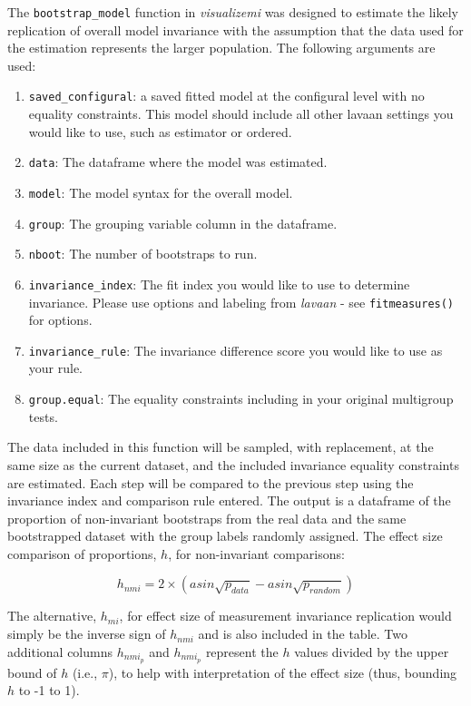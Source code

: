 \documentclass[
  man,floatsintext]{apa7}
\providecommand{\tightlist}{%
  \setlength{\itemsep}{0pt}\setlength{\parskip}{0pt}}
\begin{document}
The \texttt{bootstrap\_model} function in \emph{visualizemi} was designed to estimate the likely replication of overall model invariance with the assumption that the data used for the estimation represents the larger population. The following arguments are used:

\begin{enumerate}
\def\labelenumi{\arabic{enumi})}
\tightlist
\item
  \texttt{saved\_configural}: a saved fitted model at the configural level with no equality constraints. This model should include all other lavaan settings you would like to use, such as estimator or ordered.
\item
  \texttt{data}: The dataframe where the model was estimated.
\item
  \texttt{model}: The model syntax for the overall model.
\item
  \texttt{group}: The grouping variable column in the dataframe.
\item
  \texttt{nboot}: The number of bootstraps to run.
\item
  \texttt{invariance\_index}: The fit index you would like to use to determine invariance. Please use options and labeling from \emph{lavaan} - see \texttt{fitmeasures()} for options.
\item
  \texttt{invariance\_rule}: The invariance difference score you would like to use as your rule.
\item
  \texttt{group.equal}: The equality constraints including in your original multigroup tests.
\end{enumerate}

The data included in this function will be sampled, with replacement, at the same size as the current dataset, and the included invariance equality constraints are estimated. Each step will be compared to the previous step using the invariance index and comparison rule entered. The output is a dataframe of the proportion of non-invariant bootstraps from the real data and the same bootstrapped dataset with the group labels randomly assigned. The effect size comparison of proportions, \(h\), for non-invariant comparisons:

\[h_{nmi} = 2 \times (asin\sqrt{p_{data}} - asin\sqrt{p_{random}})\]

The alternative, \(h_{mi}\), for effect size of measurement invariance replication would simply be the inverse sign of \(h_{nmi}\) and is also included in the table. Two additional columns \(h_{nmi_p}\) and \(h_{nmi_p}\) represent the \(h\) values divided by the upper bound of \(h\) (i.e., \(\pi\)), to help with interpretation of the effect size (thus, bounding \(h\) to -1 to 1).
\end{document}

